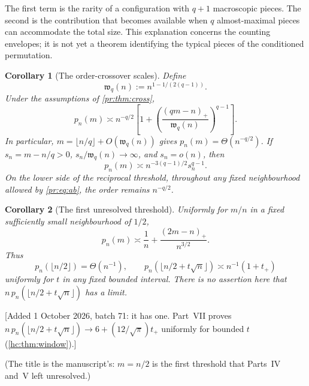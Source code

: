 \documentclass[11pt,a4paper]{article}
\newtheorem{corollary}[corollary]{Corollary}
\theoremstyle{definition}\newaliascnt{definition}{theorem}
\theoremstyle{remark}\newaliascnt{remark}{theorem}
\newcommand{\prpos}[1]{(#1)_+}
\begin{document}
The first term is the rarity of a configuration with $q+1$ macroscopic
pieces. The second is the contribution that becomes available when $q$
almost-maximal pieces can accommodate the total size. This explanation
concerns the counting envelopes; it is not yet a theorem identifying the
typical pieces of the conditioned permutation.

\begin{corollary}[The order-crossover scales]\label{pr:cor:scales}
Define
\begin{equation}
 \mathfrak w_q(n):=n^{1-1/(2(q-1))}.
 \label{pr:eq:window}
\end{equation}
Under the assumptions of \cref{pr:thm:cross},
\begin{equation}
 p_n(m)\asymp n^{-q/2}
 \left[1+\left(\frac{\prpos{qm-n}}{\mathfrak w_q(n)}\right)^{q-1}\right].
 \label{pr:eq:crossfactored}
\end{equation}
In particular, $m=\lfloor n/q\rfloor+O(\mathfrak w_q(n))$ gives
$p_n(m)=\Theta(n^{-q/2})$. If $s_n=m-n/q>0$,
$s_n/\mathfrak w_q(n)\to\infty$, and $s_n=o(n)$, then
\begin{equation}
 p_n(m)\asymp n^{-3(q-1)/2}s_n^{q-1}.
 \label{pr:eq:outsidewindow}
\end{equation}
On the lower side of the reciprocal threshold, throughout any fixed
neighbourhood allowed by \eqref{pr:eq:ab}, the order remains $n^{-q/2}$.
\end{corollary}

\begin{corollary}[The first unresolved threshold]\label{pr:cor:half}
Uniformly for $m/n$ in a fixed sufficiently small neighbourhood of $1/2$,
\begin{equation}
 p_n(m)\asymp \frac1n+\frac{\prpos{2m-n}}{n^{3/2}}.
 \label{pr:eq:half}
\end{equation}
Thus
\[
 p_n(\lfloor n/2\rfloor)=\Theta(n^{-1}),\qquad
 p_n(\lfloor n/2+t\sqrt n\rfloor)\asymp n^{-1}(1+t_+)
\]
uniformly for $t$ in any fixed bounded interval. There is no assertion here
that $n\,p_n(\lfloor n/2+t\sqrt n\rfloor)$ has a limit.
\end{corollary}

[Added 1 October 2026, batch 71: it has one. Part~VII proves
$n\,p_n(\lfloor n/2+t\sqrt n\rfloor)\to6+(12/\sqrt\pi)t_+$ uniformly for
bounded $t$ (\cref{hc:thm:window}).]

(The title is the manuscript's: $m=n/2$ is the first threshold that
Parts~IV and~V left unresolved.)
\end{document}

